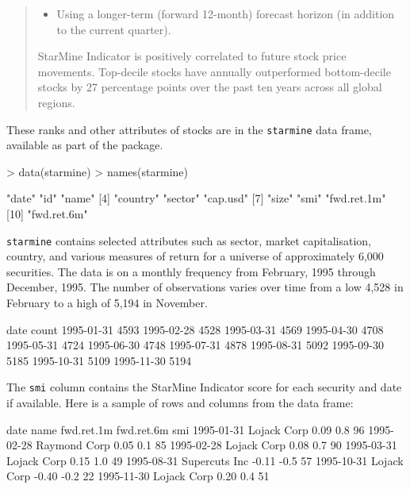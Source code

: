 \documentclass[a4paper]{report}
\begin{document}
\begin{article}
\begin{quote}
\begin{itemize}
\item Using a longer-term (forward 12-month) forecast horizon (in
  addition to the current quarter).

\end{itemize}

StarMine Indicator is positively correlated to future stock price
movements. Top-decile stocks have annually outperformed bottom-decile
stocks by 27 percentage points over the past ten years across all
global regions.
\end{quote}

\normalsize

These ranks and other attributes of stocks are in the
\texttt{starmine} data frame, available as part of the
 package.


\begin{Schunk}
\begin{Sinput}
> data(starmine)
> names(starmine)
\end{Sinput}
\begin{Soutput}
 [1] "date"       "id"         "name"      
 [4] "country"    "sector"     "cap.usd"   
 [7] "size"       "smi"        "fwd.ret.1m"
[10] "fwd.ret.6m"
\end{Soutput}
\end{Schunk}

\texttt{starmine} contains selected attributes such as sector, market
capitalisation, country, and various measures of return for a universe
of approximately 6,000 securities.  The data is on a monthly frequency
from February, 1995 through December, 1995.  The number of observations
varies over time from a low 4,528 in February to a high of 5,194 in
November.

\begin{Schunk}
\begin{Soutput}
      date count
1995-01-31  4593
1995-02-28  4528
1995-03-31  4569
1995-04-30  4708
1995-05-31  4724
1995-06-30  4748
1995-07-31  4878
1995-08-31  5092
1995-09-30  5185
1995-10-31  5109
1995-11-30  5194
\end{Soutput}
\end{Schunk}

The \texttt{smi} column contains the StarMine Indicator score for each
security and date if available.  Here is a sample of rows
and columns from the data frame:


\begin{Schunk}
\begin{Soutput}
      date          name fwd.ret.1m fwd.ret.6m smi
1995-01-31   Lojack Corp       0.09        0.8  96
1995-02-28  Raymond Corp       0.05        0.1  85
1995-02-28   Lojack Corp       0.08        0.7  90
1995-03-31   Lojack Corp       0.15        1.0  49
1995-08-31 Supercuts Inc      -0.11       -0.5  57
1995-10-31   Lojack Corp      -0.40       -0.2  22
1995-11-30   Lojack Corp       0.20        0.4  51
\end{Soutput}
\end{Schunk}



\end{article}
\end{document}
